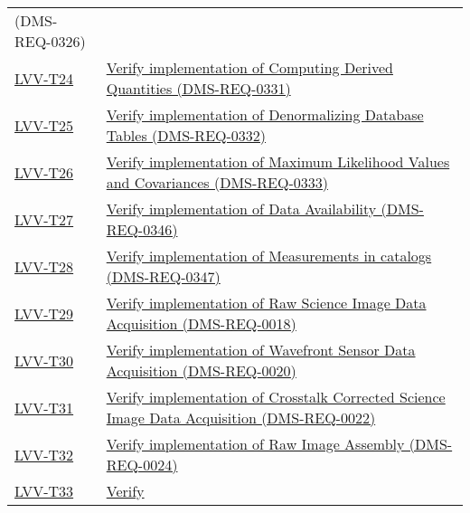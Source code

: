 \begin{longtable}[]{@{}ll@{}}
{(DMS-REQ-0326)}\tabularnewline
\protect\hyperlink{lvv-t24---verify-implementation-of-computing-derived-quantities-dms-req-0331}{LVV-T24}
&
\href{https://jira.lsstcorp.org/secure/Tests.jspa\#/testCase/LVV-T24}{Verify
implementation of Computing Derived Quantities
(DMS-REQ-0331)}\tabularnewline
\protect\hyperlink{lvv-t25---verify-implementation-of-denormalizing-database-tables-dms-req-0332}{LVV-T25}
&
\href{https://jira.lsstcorp.org/secure/Tests.jspa\#/testCase/LVV-T25}{Verify
implementation of Denormalizing Database Tables
(DMS-REQ-0332)}\tabularnewline
\protect\hyperlink{lvv-t26---verify-implementation-of-maximum-likelihood-values-and-covariances-dms-req-0333}{LVV-T26}
&
\href{https://jira.lsstcorp.org/secure/Tests.jspa\#/testCase/LVV-T26}{Verify
implementation of Maximum Likelihood Values and Covariances
(DMS-REQ-0333)}\tabularnewline
\protect\hyperlink{lvv-t27---verify-implementation-of-data-availability-dms-req-0346}{LVV-T27}
&
\href{https://jira.lsstcorp.org/secure/Tests.jspa\#/testCase/LVV-T27}{Verify
implementation of Data Availability (DMS-REQ-0346)}\tabularnewline
\protect\hyperlink{lvv-t28---verify-implementation-of-measurements-in-catalogs-dms-req-0347}{LVV-T28}
&
\href{https://jira.lsstcorp.org/secure/Tests.jspa\#/testCase/LVV-T28}{Verify
implementation of Measurements in catalogs
(DMS-REQ-0347)}\tabularnewline
\protect\hyperlink{lvv-t29---verify-implementation-of-raw-science-image-data-acquisition-dms-req-0018}{LVV-T29}
&
\href{https://jira.lsstcorp.org/secure/Tests.jspa\#/testCase/LVV-T29}{Verify
implementation of Raw Science Image Data Acquisition
(DMS-REQ-0018)}\tabularnewline
\protect\hyperlink{lvv-t30---verify-implementation-of-wavefront-sensor-data-acquisition-dms-req-0020}{LVV-T30}
&
\href{https://jira.lsstcorp.org/secure/Tests.jspa\#/testCase/LVV-T30}{Verify
implementation of Wavefront Sensor Data Acquisition
(DMS-REQ-0020)}\tabularnewline
\protect\hyperlink{lvv-t31---verify-implementation-of-crosstalk-corrected-science-image-data-acquisition-dms-req-0022}{LVV-T31}
&
\href{https://jira.lsstcorp.org/secure/Tests.jspa\#/testCase/LVV-T31}{Verify
implementation of Crosstalk Corrected Science Image Data Acquisition
(DMS-REQ-0022)}\tabularnewline
\protect\hyperlink{lvv-t32---verify-implementation-of-raw-image-assembly-dms-req-0024}{LVV-T32}
&
\href{https://jira.lsstcorp.org/secure/Tests.jspa\#/testCase/LVV-T32}{Verify
implementation of Raw Image Assembly (DMS-REQ-0024)}\tabularnewline
\protect\hyperlink{lvv-t33---verify-implementation-of-raw-science-image-metadata-dms-req-0068}{LVV-T33}
&
\href{https://jira.lsstcorp.org/secure/Tests.jspa\#/testCase/LVV-T33}{Verify
}
\end{longtable}
